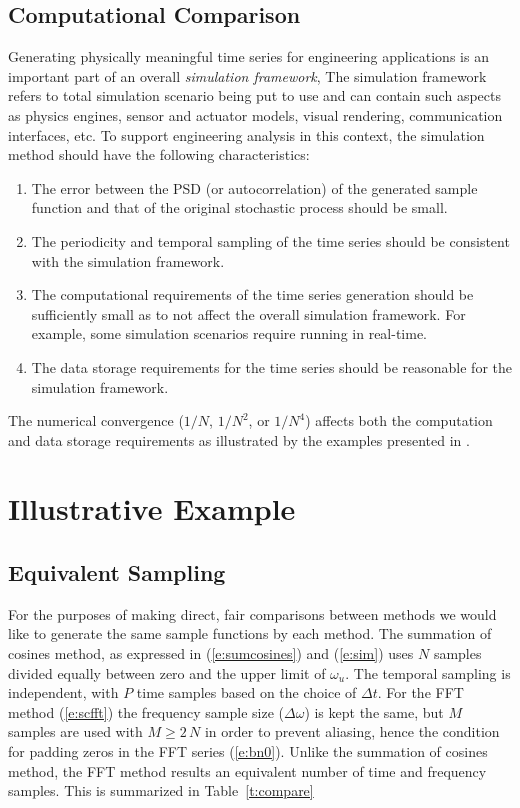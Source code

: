 \documentclass[techreport, article]{npsreport2018}
\begin{document}
\subsection{Computational Comparison}

Generating physically meaningful time series for engineering applications is an important part of an overall \emph{simulation framework},  The simulation framework refers to total simulation scenario being put to use and can contain such aspects as physics engines, sensor and actuator models, visual rendering, communication interfaces, etc.  To support engineering analysis in this context, the simulation method should have the following characteristics:
\begin{enumerate}
\item The error between the PSD (or autocorrelation) of the generated sample function and that of the original stochastic process should be small.
\item The periodicity and temporal sampling of the time series should be consistent with the simulation framework.
\item The computational requirements of the time series generation should be sufficiently small as to not affect the overall simulation framework.  For example, some simulation scenarios require running in real-time.
\item The data storage requirements for the time series should be reasonable for the simulation framework.
\end{enumerate}

The numerical convergence ($1/N$, $1/N^2$, or $1/N^4$) affects both the computation and data storage requirements as illustrated by the examples presented in \cite{hu97simulation}.

\section{Illustrative Example}

\subsection{Equivalent Sampling}

For the purposes of making direct, fair comparisons between methods we would like to generate the same sample functions by each method.  The summation of cosines method, as expressed in (\ref{e:sumcosines}) and (\ref{e:sim}) uses $N$ samples divided equally between zero and the upper limit of $\omega_u$.  The temporal sampling is independent, with $P$ time samples based on the choice of $\Delta t$.  For the FFT method (\ref{e:scfft}) the frequency sample size ($\Delta \omega$) is kept the same, but $M$ samples are used with $M\geq 2 \, N$ in order to prevent aliasing, hence the condition for padding zeros in the FFT series (\ref{e:bn0}).  Unlike the summation of cosines method, the FFT method results an equivalent number of time and frequency samples.  This is summarized in Table~\ref{t:compare}
\end{document}
